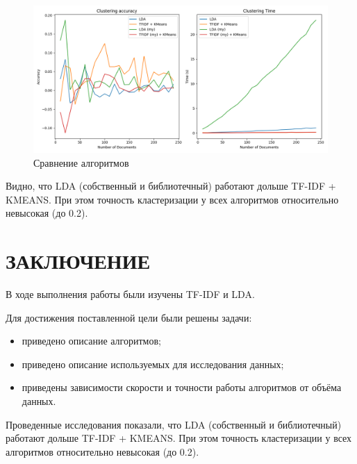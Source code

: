 \documentclass[12pt]{report}
\begin{document}
\begin{figure}[H]
	\centering
	\includegraphics[width=\textwidth]{inc/res_250_2.png}
	\caption{Сравнение алгоритмов}
	\label{img:time4}
\end{figure}


Видно, что LDA (собственный и библиотечный) работают дольше TF-IDF + KMEANS. При этом точность кластеризации у всех алгоритмов относительно невысокая (до 0.2).


\chapter*{ЗАКЛЮЧЕНИЕ}
В ходе выполнения работы были изучены TF-IDF и LDA.

Для достижения поставленной цели были решены задачи:
\begin{itemize}
	\item приведено описание алгоритмов;
	\item приведено описание используемых для исследования данных;
	\item приведены зависимости скорости и точности работы алгоритмов от объёма данных.
\end{itemize}

Проведенные исследования показали, что LDA (собственный и библиотечный) работают дольше TF-IDF + KMEANS. При этом точность кластеризации у всех алгоритмов относительно невысокая (до 0.2).

\pagebreak

\printbibliography[title={СПИСОК ИСПОЛЬЗОВАННЫХ\\ ИСТОЧНИКОВ}]


\pagebreak
\end{document}
